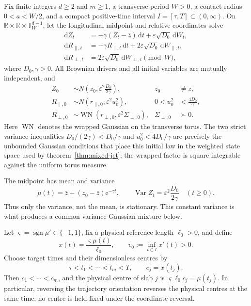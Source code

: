 \documentclass{iopjournal}
\newcommand{\dd}{\mathrm d}
\newcommand{\e}{\mathrm e}
\theoremstyle{plain}
\theoremstyle{definition}
\begin{document}
Fix finite integers \(d\ge2\) and \(m\ge1\), a transverse period \(W>0\), a
contact radius \(0<a<W/2\), and a compact positive-time interval
\(I=[\tau,T]\subset(0,\infty)\).  On
\(\mathbb R\times\mathbb R\times\mathbb T_W^{d-1}\), let the longitudinal
midpoint and relative coordinates solve
\begin{align}
 \dd Z_t&=-\gamma(Z_t-\bar z)\,\dd t
       +\varepsilon\sqrt{D_0}\,\dd W_t,
 \label{eq:exactmfull-midpoint-sde}\\
 \dd R_{\parallel,t}&=-\gamma R_{\parallel,t}\,\dd t
       +2\varepsilon\sqrt{D_0}\,\dd W_{\parallel,t},
 \label{eq:exactmfull-relative-long-sde}\\
 \dd R_{\perp,t}&=2\varepsilon\sqrt{D_0}\,\dd W_{\perp,t}
       \pmod W,
 \label{eq:exactmfull-relative-perp-sde}
\end{align}
where \(D_0,\gamma>0\).  All Brownian drivers and all initial variables are
mutually independent, and
\begin{align}
 Z_0&\sim N\!\left(z_0,\varepsilon^2\frac{D_0}{2\gamma}\right),
 &z_0&\ne\bar z,
 \label{eq:exactmfull-midpoint-initial}\\
 R_{\parallel,0}&\sim
 N(r_{\parallel,0},\varepsilon^2u_0^2),
 &0<u_0^2&<\frac{4D_0}{\gamma},
 \label{eq:exactmfull-relative-long-initial}\\
 R_{\perp,0}&\sim
 \operatorname{WN}(r_{\perp,0},\varepsilon^2\Sigma_{\perp,0}),
 &\Sigma_{\perp,0}&\succ0.
 \label{eq:exactmfull-relative-perp-initial}
\end{align}
Here \(\operatorname{WN}\) denotes the wrapped Gaussian on the transverse
torus.  The two strict variance inequalities
\(D_0/(2\gamma)<D_0/\gamma\) and
\(u_0^2<4D_0/\gamma\) are precisely the unbounded Gaussian conditions that
place this initial law in the weighted state space used by
theorem~\ref{thm:mixed-jet}; the wrapped factor is square integrable against
the uniform torus measure.

The midpoint has mean and variance
\begin{equation}
 \mu(t)=\bar z+(z_0-\bar z)\e^{-\gamma t},
 \qquad
 \operatorname{Var}Z_t=\varepsilon^2\frac{D_0}{2\gamma}
 \quad(t\ge0).
 \label{eq:exactmfull-stationary-variance}
\end{equation}
Thus only the variance, not the mean, is stationary.  This constant variance
is what produces a common-variance Gaussian mixture below.

Let \(\varsigma=\operatorname{sgn}\mu'\in\{-1,1\}\), fix a physical
reference length \(\ell_0>0\), and define
\begin{equation}
 x(t)=\frac{\varsigma\mu(t)}{\ell_0},
 \qquad v_0:=\inf_{t\in I}x'(t)>0.
 \label{eq:exactmfull-increasing-coordinate}
\end{equation}
Choose target times and their dimensionless centres by
\begin{equation}
 \tau<t_1<\cdots<t_m<T,
 \qquad c_j=x(t_j).
 \label{eq:exactmfull-targets}
\end{equation}
Then \(c_1<\cdots<c_m\), and the physical centre of slab \(j\) is
\(\varsigma\ell_0c_j=\mu(t_j)\).  In particular, reversing the trajectory
orientation reverses the physical centres at the same time; no centre is
held fixed under the coordinate reversal.
\end{document}
